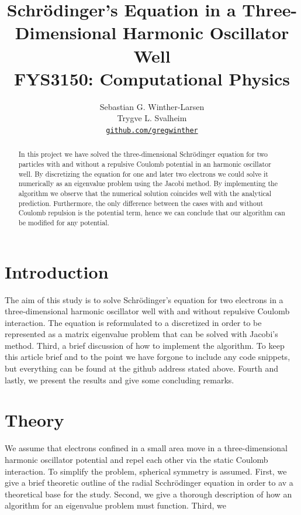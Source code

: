 \documentclass[10pt, a4paper]{amsart}
\title[Schrödinger's Equation in 3D]{Schrödinger's Equation in a Three-Dimensional Harmonic Oscillator Well \\
  \hrulefill\small{ FYS3150: Computational Physics }\hrulefill}
\author[Winther-Larsen \& Svalheim]{Sebastian G. Winther-Larsen \\ 
Trygve L. Svalheim \\
\href{https://github.com/gregwinther/FYS3150/}{\texttt{github.com/gregwinther}}}
\begin{document}
\begin{titlepage}
\begin{abstract}
In this project we have solved the three-dimensional Schrödinger equation for two particles with and without a repulsive Coulomb potential in an harmonic oscillator well. By discretizing the equation for one and later two electrons we could solve it numerically as an eigenvalue problem using the Jacobi method. By implementing the algorithm we observe that the numerical solution coincides well with the analytical prediction. Furthermore, the only difference between the cases with and without Coulomb repulsion is the potential term, hence we can conclude that our algorithm can be modified for any potential. 
\end{abstract}
\maketitle
\tableofcontents
\end{titlepage}

\section{Introduction}

The aim of this study is to solve Schrödinger's equation for two electrons in a three-dimensional  harmonic oscillator well with and without repulsive Coulomb interaction. The equation is reformulated to a discretized in order to be represented as a matrix eigenvalue problem that can be solved with Jacobi's method. Third, a brief discussion of how to implement the algorithm. To keep this article brief and to the point we have forgone to include any code snippets, but everything can be found at the github address stated above. Fourth and lastly, we present the results and give some concluding remarks.

\section{Theory}
We assume that electrons confined in a small area move in a three-dimensional harmonic oscillator potential and repel each other via the static Coulomb interaction. To simplify the problem, spherical symmetry is assumed. First, we give a brief theoretic outline of the radial Scchrödinger equation in order to av a theoretical base for the study. Second, we give a thorough description of how an algorithm for an eigenvalue problem must function. Third, we 
\end{document}
